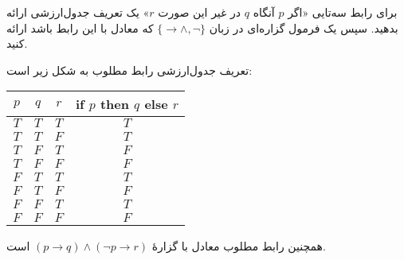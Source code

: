 برای رابط سه‌تایی «اگر $p$ آنگاه $q$ در غیر این صورت $r$» یک تعریف جدول‌ارزشی ارائه بدهید. سپس یک فرمول گزاره‌ای در زبان
$\{\to\wedge,\neg\}$
که معادل با این رابط باشد ارائه کنید.
\begin{ans}
تعریف جدول‌ارزشی رابط مطلوب به شکل زیر است:
\begin{LTR}
        \begin{tabular}{ c | c | c | c }
          $p$ & $q$ & $r$ & if $p$ then $q$ else $r$ \\
          \hline
          $T$ & $T$ & $T$ & $T$ \\
          $T$ & $T$ & $F$ & $T$ \\
          $T$ & $F$ & $T$ & $F$ \\
          $T$ & $F$ & $F$ & $F$ \\
          $F$ & $T$ & $T$ & $T$ \\
          $F$ & $T$ & $F$ & $F$ \\
          $F$ & $F$ & $T$ & $T$ \\
          $F$ & $F$ & $F$ & $F$
        \end{tabular}
  \end{LTR}
  همچنین رابط مطلوب معادل با گزارهٔ
  $(p\to q)\wedge(\neg p\to r)$
  است.
\end{ans}
